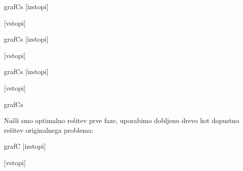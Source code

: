 \documentclass[14pt]{extarticle}
\begin{document}
\begin{razvoz}[scale=0.9]{grafCs}
    [izstopi]


    [vstopi]
\end{razvoz}

\begin{razvoz}[scale=0.9]{grafCs}
    [izstopi]


    [vstopi]
\end{razvoz}

\begin{razvoz}[scale=0.9]{grafCs}
    [izstopi]


    [vstopi]
\end{razvoz}

\begin{razvoz}[scale=0.9]{grafCs}

\end{razvoz}

\clearpage

Našli smo optimalno rešitev prve faze, uporabimo dobljeno drevo kot dopustno rešitev originalnega problema:

\begin{razvoz}[scale=0.9]{grafC}
    [izstopi]


    [vstopi]
\end{razvoz}
\end{document}
